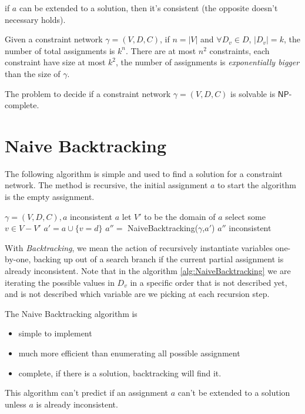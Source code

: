 \documentclass[10pt, letterpaper]{report}
\begin{document}
\begin{proposition}
    if $a$ can be extended to a solution, then it's consistent (the opposite doesn't necessary holds).
\end{proposition}
Given a constraint network $\gamma=(V,D,C)$, if $n=|V|$ and $\forall D_v\in D$, $|D_v|=k$, the number of total assignments is $k^n$. There are at most $n^2$ constraints, each constraint have size at most $k^2$, the number of assignments is \textit{exponentially bigger} than the size of $\gamma$.\begin{theorem}
    The problem to decide if a constraint network $\gamma=(V,D,C)$ is solvable is  $\mathsf{NP}$-complete.
\end{theorem}
\section{Naive Backtracking}
The following algorithm is simple and used to find a solution for a constraint network. The method is recursive, the initial assignment $a$ to start the algorithm is the empty assignment.
 \begin{algorithm}
    \caption{NaiveBacktracking}\label{alg:NaiveBacktracking}
    \begin{algorithmic}
    \Require $\gamma=(V,D,C),a$
     \State\Return inconsistent\EndIf
     \State\Return $a$\EndIf
    \State let $V'$ to be the domain of $a$
    \State select \color{blue} some  \color{black} $v\in V-V'$ 
    \State $a'=a\cup \{v=d\}$
    \State $a''=$ NaiveBacktracking($\gamma$,$a'$)
     \State\Return $a''$\EndIf
    \EndFor
    \State\Return inconsistent
    \end{algorithmic}
\end{algorithm}
With \textit{Backtracking}, we mean the action of recursively instantiate variables one-by-one, backing up out
of a search branch if the current partial assignment is already inconsistent.
Note that in the algorithm \ref{alg:NaiveBacktracking} we are iterating the possible values in $D_v$ in a specific \color{blue} order \color{black} that is not described yet, and is not described which variable are we picking at each recursion step.\bigskip 

\noindent The Naive Backtracking algorithm is\begin{itemize}
    \item simple to implement 
    \item much more efficient than enumerating all possible assignment
    \item complete, if there is a solution, backtracking
will find it.
\end{itemize}
This algorithm can't predict if an assignment $a$ can't be extended to a solution unless $a$ is already inconsistent.
\end{document}
